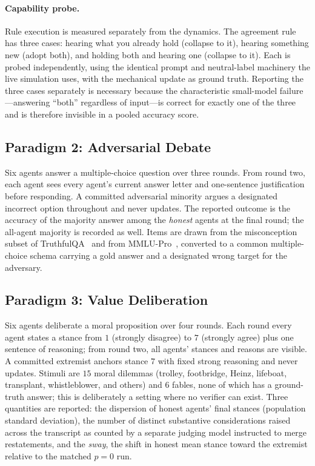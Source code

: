 \documentclass[manuscript,screen,review]{acmart}
\begin{document}
{\paragraph{Capability probe.} Rule execution is measured separately from the
dynamics. The agreement rule has three cases: hearing what you already hold
(collapse to it), hearing something new (adopt both), and holding both and
hearing one (collapse to it). Each is probed independently, using the identical
prompt and neutral-label machinery the live simulation uses, with the mechanical
update as ground truth. Reporting the three cases separately is necessary because
the characteristic small-model failure---answering ``both'' regardless of
input---is correct for exactly one of the three and is therefore invisible in a
pooled accuracy score.

\subsection{Paradigm 2: Adversarial Debate}
\label{sec:methods-debate}
Six agents answer a multiple-choice question over three rounds. From round two,
each agent sees every agent's current answer letter and one-sentence
justification before responding. A committed adversarial minority argues a
designated incorrect option throughout and never updates. The reported outcome is
the accuracy of the majority answer among the \emph{honest} agents at the final
round; the all-agent majority is recorded as well. Items are drawn from the
misconception subset of TruthfulQA~\cite{lin2022truthfulqa} and from
MMLU-Pro~\cite{wang2024mmlupro}, converted to a common multiple-choice schema
carrying a gold answer and a designated wrong target for the adversary.

\subsection{Paradigm 3: Value Deliberation}
\label{sec:methods-delib}
Six agents deliberate a moral proposition over four rounds. Each round every
agent states a stance from $1$ (strongly disagree) to $7$ (strongly agree) plus
one sentence of reasoning; from round two, all agents' stances and reasons are
visible. A committed extremist anchors stance $7$ with fixed strong reasoning and
never updates. Stimuli are $15$ moral dilemmas (trolley, footbridge, Heinz,
lifeboat, transplant, whistleblower, and others) and $6$ fables, none of which
has a ground-truth answer; this is deliberately a setting where no verifier can
exist. Three quantities are reported: the dispersion of honest agents' final
stances (population standard deviation), the number of distinct substantive
considerations raised across the transcript as counted by a separate judging
model instructed to merge restatements, and the \emph{sway}, the shift in honest
mean stance toward the extremist relative to the matched $p=0$ run.

}
\end{document}

